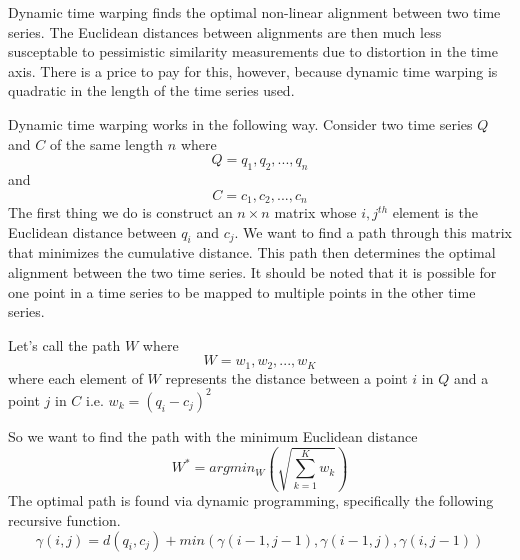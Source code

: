 \documentclass[11pt]{article}
\begin{document}
    Dynamic time warping finds the optimal non-linear alignment between two
time series. The Euclidean distances between alignments are then much
less susceptable to pessimistic similarity measurements due to
distortion in the time axis. There is a price to pay for this, however,
because dynamic time warping is quadratic in the length of the time
series used.

    Dynamic time warping works in the following way. Consider two time
series \(Q\) and \(C\) of the same length \(n\) where
\[Q=q_1,q_2,...,q_n\] and \[C=c_1,c_2,...,c_n\] The first thing we do is
construct an \(n\times n\) matrix whose \(i,j^{th}\) element is the
Euclidean distance between \(q_i\) and \(c_j\). We want to find a path
through this matrix that minimizes the cumulative distance. This path
then determines the optimal alignment between the two time series. It
should be noted that it is possible for one point in a time series to be
mapped to multiple points in the other time series.

    Let's call the path \(W\) where \[W=w_1,w_2,...,w_K\] where each element
of \(W\) represents the distance between a point \(i\) in \(Q\) and a
point \(j\) in \(C\) i.e. \(w_k=(q_i-c_j)^2\)

    So we want to find the path with the minimum Euclidean distance
\[W^*=argmin_W(\sqrt{\sum_{k=1}^Kw_k})\] The optimal path is found via
dynamic programming, specifically the following recursive function.
\[\gamma(i,j)=d(q_i,c_j)+min ( \gamma(i-1,j-1),\gamma(i-1,j),\gamma(i,j-1))\]
\end{document}
